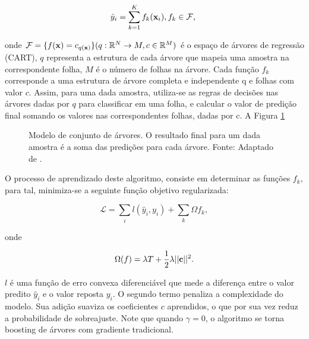 \begin{equation}\label{eq:xgboost}
\hat{y}_i=\sum_{k=1}^{K}f_{k}({\bf x}_i)\mbox{,}\,f_{k}\in\mathcal{F}\mbox{,}~
\end{equation}

onde $\mathcal{F}=\{f({\bf x})=c_{q({\bf x})}\}(q:\mathbb{R}^N\to{M},c\in\mathbb{R}^{M})$ é o espaço de árvores de regressão (CART), $q$ representa a estrutura de cada árvore que mapeia uma amostra na correspondente folha, $M$ é o número de folhas na árvore. Cada função $f_k$ corresponde a uma estrutura de árvore completa e independente q e folhas com valor $c$. Assim, para uma dada amostra, utiliza-se as regras de decisões nas árvores dadas por $q$ para classificar em uma folha, e calcular o valor de predição final somando os valores nas correspondentes folhas, dadas por c. A Figura \ref{fig:tree_model}

\begin{figure}[H]
\centering
{}
\caption{Modelo de conjunto de árvores. O resultado final para um dada amostra é a soma das predições para cada árvore. Fonte: Adaptado de \cite{CHEN:2016}.}
\label{fig:tree_model}
\end{figure}

O processo de aprendizado deste algoritmo, consiste em determinar as funções $f_k$, para tal, minimiza-se a seguinte função objetivo regularizada:

\begin{equation}\label{eq:xgboostmin}
\mathcal{L}=\sum_{i}l(\hat{y}_i, y_i)+\sum_{k}\Omega{f_k}\mbox{,}~
\end{equation}

\noindent
onde 

\begin{equation}
\Omega(f)=\lambda{T}+\frac{1}{2}\lambda||{\bf c}||^2\mbox{.}
\end{equation}

$l$ é uma função de erro convexa diferenciável que mede a diferença entre o valor predito $\hat{y}_i$ e o valor reposta $y_i$. O segundo termo penaliza a complexidade do modelo. Sua adição suaviza os coeficientes $c$ aprendidos, o que por sua vez reduz a probabilidade de sobreajuste. Note que quando $\gamma=0$, o algoritmo se torna boosting de árvores com gradiente tradicional.

